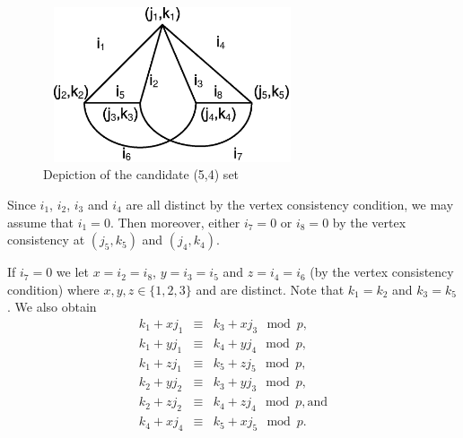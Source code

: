 
\begin{figure}
\center\includegraphics[width=3.0in,height=1.8in]{Drawing22_1.eps}
\caption{Depiction of the candidate (5,4) set} \label{fig52}
\end{figure}

Since $i_1$, $i_2$, $i_3$ and $i_4$ are all distinct by the vertex
consistency condition, we may assume that $i_1=0$. Then moreover,
either $i_7=0$ or $i_8=0$ by the vertex consistency at $(j_5,k_5)$
and $(j_4,k_4)$.

If $i_7=0$ we let $x=i_2=i_8$, $y=i_3=i_5$ and $z=i_4=i_6$ (by the
vertex consistency condition) where $x,y,z \in \{1,2,3\}$ and are
distinct. Note that $k_1=k_2$ and $k_3=k_5$. We also obtain
\begin{eqnarray*}
k_1+xj_1 &\equiv& k_3+xj_3 \mod p, \\
k_1+yj_1 &\equiv& k_4+yj_4 \mod p, \\
k_1+zj_1 &\equiv& k_5+zj_5 \mod p, \\
k_2+yj_2 &\equiv& k_3+yj_3 \mod p, \\
k_2+zj_2 &\equiv& k_4+zj_4 \mod p, \text{and}\\
k_4+xj_4 &\equiv& k_5+xj_5 \mod p.
\end{eqnarray*}

